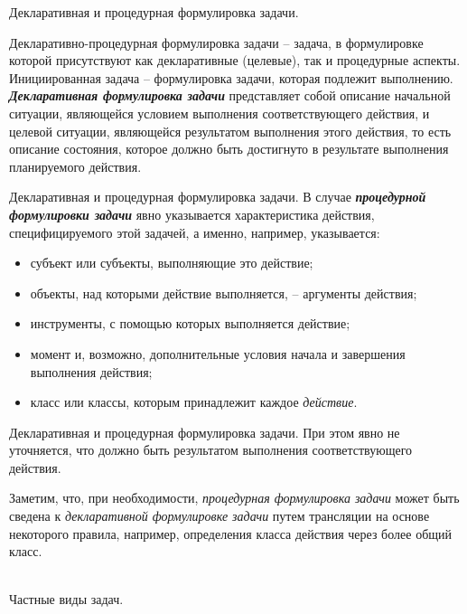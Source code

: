 \begin{frame}{Декларативная и процедурная формулировка задачи.}
	\topline
	\justifying
 
    Декларативно-процедурная формулировка задачи -- задача, в формулировке которой присутствуют как декларативные (целевые), так и процедурные аспекты.  Инициированная задача -- формулировка задачи, которая подлежит выполнению.\\
    \textbf{\textit{Декларативная формулировка задачи}} представляет собой описание начальной ситуации, являющейся условием выполнения соответствующего действия, и целевой ситуации, являющейся результатом выполнения этого действия, то есть  описание состояния, которое должно быть достигнуто в результате выполнения планируемого действия. 
\end{frame}

\begin{frame}{Декларативная и процедурная формулировка задачи.}
	\topline
	\justifying
     В случае \textbf{\textit{процедурной формулировки задачи}} явно указывается характеристика действия, специфицируемого этой задачей, а именно, например, указывается:
    \begin{itemize}
    \item субъект или субъекты, выполняющие это действие;
    \item объекты, над которыми действие выполняется, -- аргументы действия;
    \item инструменты, с помощью которых выполняется действие;
    \item момент и, возможно, дополнительные условия начала и завершения выполнения действия;
    \item класс или классы, которым принадлежит каждое \textit{действие}.
    \end{itemize}	
\end{frame}

\begin{frame}{Декларативная и процедурная формулировка задачи.}
	\topline
	\justifying
    При этом явно не уточняется, что должно быть результатом выполнения соответствующего действия. 
        
    Заметим, что, при необходимости, \textit{процедурная формулировка задачи} может быть сведена к \textit{декларативной формулировке задачи} путем трансляции на основе некоторого правила, например, определения класса действия через более общий класс.
\end{frame}

\begin{frame}{\\Частные виды задач.}
    \topline
	\justifying
    \begin{SCn}
    \end{SCn}
\end{frame}

